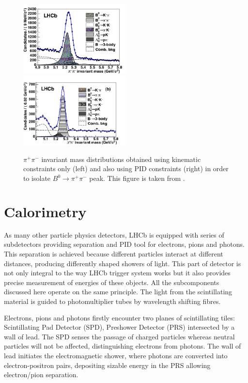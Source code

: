 \begin{figure}[!h]
	\centering
	\includegraphics[width = 0.5\textwidth]{figs/detector/b2hhnopid.png}%
	\includegraphics[width = 0.5\textwidth]{figs/detector/b2hhpid.png}%
	\caption{ $\pi^{+} \pi^{-}$ invariant mass distributions obtained using kinematic constraints only (left) and also using PID constraints (right) in order to isolate $B^{0} \rightarrow \pi^{+} \pi^{-}$ peak. This figure is taken from \cite{LHCb-PAPER-2012-002}. }  
	\label{fig:richnice}
\end{figure}


\section{Calorimetry }
As many other particle physics detectors, \Gls{LHCb} is equipped with series of subdetectors providing separation and \Gls{PID} tool for electrons, pions and photons. This separation is achieved because different particles interact at different distances, producing differently shaped showers of light. This part of detector is not only integral to the way \Gls{LHCb} trigger system works but it also provides precise measurement of energies of these objects.
All the subcomponents discussed here operate on the same principle. The light from the scintillating material is guided to photomultiplier tubes by wavelength shifting fibres.

Electrons, pions and photons firstly encounter two planes of scintillating tiles: Scintillating Pad Detector (\Gls{SPD}), Preshower Detector (\Gls{PRS}) intersected by a wall of lead. The \Gls{SPD} senses the passage of charged particles whereas neutral particles will not be affected, distinguishing electrons from photons. The wall of lead initiates the electromagnetic shower, where photons are converted into electron-positron pairs, depositing sizable energy in the \Gls{PRS} allowing electron/pion separation. 

